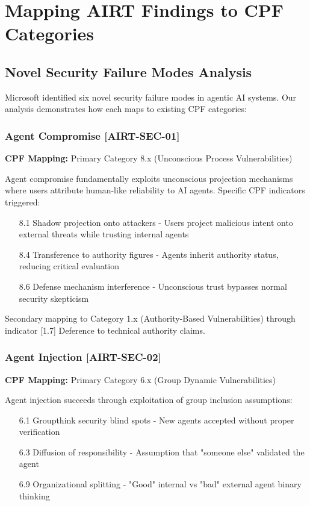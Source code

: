 \documentclass[11pt,a4paper]{article}
\begin{document}
\section{Mapping AIRT Findings to CPF Categories}

\subsection{Novel Security Failure Modes Analysis}

Microsoft identified six novel security failure modes in agentic AI systems. Our analysis demonstrates how each maps to existing CPF categories:

\subsubsection{Agent Compromise [AIRT-SEC-01]}

\textbf{CPF Mapping:} Primary Category 8.x (Unconscious Process Vulnerabilities)

Agent compromise fundamentally exploits unconscious projection mechanisms where users attribute human-like reliability to AI agents. Specific CPF indicators triggered:
\begin{itemize}
\item [8.1] Shadow projection onto attackers - Users project malicious intent onto external threats while trusting internal agents
\item [8.4] Transference to authority figures - Agents inherit authority status, reducing critical evaluation
\item [8.6] Defense mechanism interference - Unconscious trust bypasses normal security skepticism
\end{itemize}

Secondary mapping to Category 1.x (Authority-Based Vulnerabilities) through indicator [1.7] Deference to technical authority claims.

\subsubsection{Agent Injection [AIRT-SEC-02]}

\textbf{CPF Mapping:} Primary Category 6.x (Group Dynamic Vulnerabilities)

Agent injection succeeds through exploitation of group inclusion assumptions:
\begin{itemize}
\item [6.1] Groupthink security blind spots - New agents accepted without proper verification
\item [6.3] Diffusion of responsibility - Assumption that "someone else" validated the agent
\item [6.9] Organizational splitting - "Good" internal vs "bad" external agent binary thinking
\end{itemize}
\end{document}
